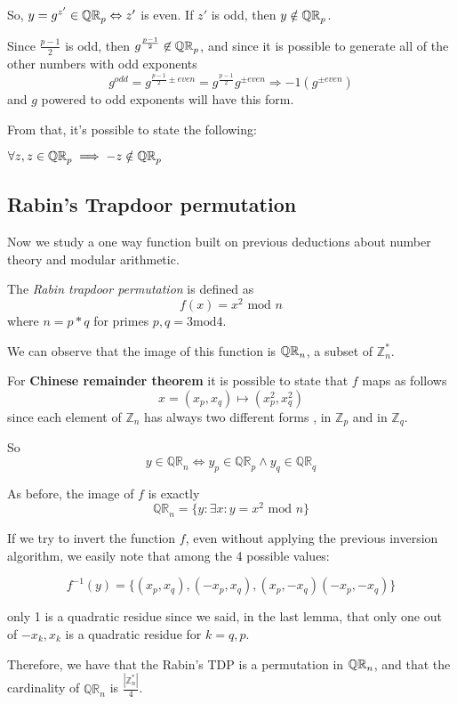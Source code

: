 So, $y=g^{z'} \in \QR[p] \Leftrightarrow z'$ is even. If $z'$ is odd, then $y \notin \QR[p] $.

Since $\frac{p-1}{2}$ is odd, then $g^{\frac{p-1}{2}} \not\in \QR[p]$, and since
it is possible to generate all of the other numbers with odd exponents 
\[
    g^{odd}=g^{\frac{p-1}{2} \pm even}=g^{\frac{p-1}{2}}g^{ \pm even} \Rightarrow -1(g^{\pm even})
\]
and $g$ powered to odd exponents will have this form.

From that, it's possible to state the following:
\begin{lemma}
    $\forall z, z\in \QR[p] \implies  -z \notin \QR[p]$
\end{lemma}

\subsection{Rabin's Trapdoor permutation}

Now we study a one way function built on previous deductions about number theory and modular arithmetic.

The \textit{Rabin trapdoor permutation} is defined as 
\[
    f(x)=x^{2} \text{ mod } n
\]
where $n=p*q$ for primes $p,q=3 \text{mod} 4$.

We can observe that the image of this function is $\QR[n]$, a subset of $\mathbb{Z}^{*}_{n} $.

For \textbf{Chinese remainder theorem} it is possible to state that $f$ maps
as follows
\[
    x= (x_{p}, x_{q}) \mapsto (x^{2}_{p}, x^{2}_{q})
\]
since each element of $ \mathbb{Z}_n$ has always two different forms , in $
\mathbb{Z}_{p} $ and in $ \mathbb{Z}_{q} $.

So
\[
y \in  \mathbb{QR}_{n} \Leftrightarrow y_{p} \in \mathbb{QR}_{p} \wedge y_{q} \in
\mathbb{QR}_{q} 
\]

As before, the image of $f$ is exactly
\[
    \mathbb{QR}_{n} = \{ y: \exists x : y=x^{2} \text{ mod } n\}
\]

If we try to invert the function $f$, even without applying the previous inversion algorithm, we easily note that among the 4 possible values:

\[
    f^{-1}(y)=\{ (x_{p}, x_{q}),(-x_{p}, x_{q}),(x_{p},- x_{q})(-x_{p},- x_{q})\}
\]\label{les15:outoffour}

only 1 is a quadratic residue since we said, in the last lemma, that only one out of $-x_{k}, x_{k}$ is a quadratic residue for $k=q,p$.

Therefore, we have that the Rabin's TDP is a permutation in $\QR[n]$, and that the cardinality of $ \mathbb{QR}_{n} $ is $\frac{|\mathbb{Z}^{*}_{n} |}{4}$.

